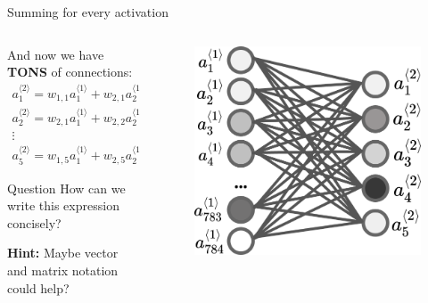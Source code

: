 \documentclass{beamer}
\begin{document}
    \begin{frame}{Summing for every activation}
        \begin{columns}
        \begin{column}{0.7\textwidth}
        And now we have \textbf{TONS} of connections:
        \begin{gather*}
            a_1^{\langle 2 \rangle} = w_{1,1}a_1^{\langle 1 \rangle} + w_{2,1}a_2^{\langle 1 \rangle} + \dots + w_{784,1}a_{784}^{\langle 1 \rangle} \\
            a_2^{\langle 2 \rangle} = w_{2,1}a_1^{\langle 1 \rangle} + w_{2,2}a_2^{\langle 1 \rangle} + \dots + w_{784,2}a_{784}^{\langle 1 \rangle} \\
            \vdots \\
            a_5^{\langle 2 \rangle} = w_{1,5}a_1^{\langle 1 \rangle} + w_{2,5}a_2^{\langle 1 \rangle} + \dots + w_{784,5}a_{784}^{\langle 1 \rangle}
        \end{gather*}

        \begin{block}{Question}
            How can we write this expression concisely?

            \textbf{Hint:} Maybe vector and matrix notation could help?
        \end{block}
        
        \end{column}

        \begin{column}{0.3\textwidth}
        \begin{figure}
        \centering
            \includegraphics[width=\textwidth]{images/presentation/layer_all_all.png}
        \end{figure}
        \end{column}
        \end{columns}
    \end{frame}
\end{document}
